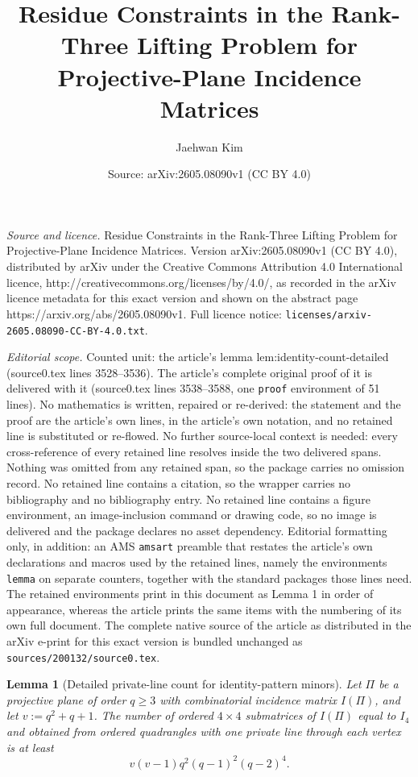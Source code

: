 \documentclass[10pt,a4paper]{amsart}
\title{Residue Constraints in the Rank-Three Lifting Problem for Projective-Plane Incidence Matrices}
\author{Jaehwan Kim}
\date{Source: arXiv:2605.08090v1 (CC BY 4.0)}
\newtheorem{lemma}{Lemma}
\begin{document}
\maketitle

\noindent\emph{Source and licence.} Residue Constraints in the Rank-Three Lifting Problem for Projective-Plane Incidence Matrices. Version arXiv:2605.08090v1 (CC BY 4.0), distributed by arXiv under the Creative Commons Attribution 4.0 International licence, http://creativecommons.org/licenses/by/4.0/, as recorded in the arXiv licence metadata for this exact version and shown on the abstract page https://arxiv.org/abs/2605.08090v1. Full licence notice: \texttt{licenses/arxiv-2605.08090-CC-BY-4.0.txt}.\par\smallskip

\noindent\textit{Editorial scope.} Counted unit: the article's lemma lem:identity-count-detailed (source0.tex lines 3528--3536). The article's complete original proof of it is delivered with it (source0.tex lines 3538--3588, one \texttt{proof} environment of 51 lines). No mathematics is written, repaired or re-derived: the statement and the proof are the article's own lines, in the article's own notation, and no retained line is substituted or re-flowed.  No further source-local context is needed: every cross-reference of every retained line resolves inside the two delivered spans.  Nothing was omitted from any retained span, so the package carries no omission record.  No retained line contains a citation, so the wrapper carries no bibliography and no bibliography entry.  No retained line contains a figure environment, an image-inclusion command or drawing code, so no image is delivered and the package declares no asset dependency.  Editorial formatting only, in addition: an AMS \texttt{amsart} preamble that restates the article's own declarations and macros used by the retained lines, namely the environments \texttt{lemma} on separate counters, together with the standard packages those lines need.  The retained environments print in this document as Lemma 1 in order of appearance, whereas the article prints the same items with the numbering of its own full document.  The complete native source of the article as distributed in the arXiv e-print for this exact version is bundled unchanged as \texttt{sources/200132/source0.tex}.
\begin{lemma}[Detailed private-line count for identity-pattern minors]
\label{lem:identity-count-detailed}
Let $\Pi$ be a projective plane of order $q\ge 3$ with combinatorial incidence matrix $I(\Pi)$, and let $v:=q^2+q+1$.
The number of ordered $4\times4$ submatrices of $I(\Pi)$ equal to $I_4$ and obtained from ordered quadrangles with one private line through each vertex is at least
\[
v(v-1)q^2(q-1)^2(q-2)^4.
\tag{A.1}
\]
\end{lemma}
\end{document}
